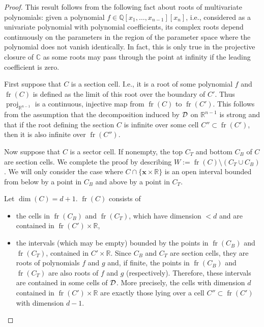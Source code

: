 \documentclass[
]{book}
\providecommand{\tightlist}{%
  \setlength{\itemsep}{0pt}\setlength{\parskip}{0pt}}
\theoremstyle{definition}
\theoremstyle{definition}
\theoremstyle{definition}
\theoremstyle{definition}
\theoremstyle{remark}
\begin{document}
\begin{proof}
This result follows from the following fact about roots of multivariate polynomials: given a polynomial \(f \in \mathbb{Q}[x_1,\ldots,x_{n-1}][x_n]\), i.e., considered as a univariate polynomial with polynomial coefficients, its complex roots depend continuously on the parameters in the region of the parameter space where the polynomial does not vanish identically. In fact, this is only true in the projective closure of \(\mathbb{C}\) as some roots may pass through the point at infinity if the leading coefficient is zero.

First suppose that \(C\) is a section cell. I.e., it is a root of some polynomial \(f\) and \({\operatorname{fr} \left( C \right)}\) is defined as the limit of this root over the boundary of \(C'\). Thus \({\operatorname{proj}_{\mathbb{R}^{n-1}}}\) is a continuous, injective map from \({\operatorname{fr} \left( C \right)}\) to \({\operatorname{fr} \left( C' \right)}\). This follows from the assumption that the decomposition induced by \(\cal D\) on \(\mathbb{R}^{n-1}\) is strong and that if the root defining the section \(C\) is infinite over some cell \(C'' \subset {\operatorname{fr} \left( C' \right)}\), then it is also infinite over \({\operatorname{fr} \left( C'' \right)}\).

Now suppose that \(C\) is a sector cell. If nonempty, the top \(C_T\) and bottom \(C_B\) of \(C\) are section cells. We complete the proof by describing \(W := {\operatorname{fr} \left( C \right)} \setminus (C_T \cup C_B)\).
We will only consider the case where \(C \cap \{ \mathbf{x} \times \mathbb{R}\}\) is an open interval bounded from below by a point in \(C_B\) and above by a point in \(C_T\).

Let \(\dim(C) = d + 1\). \({\operatorname{fr} \left( C \right)}\) consists of

\begin{itemize}
\tightlist
\item
  the cells in \({\operatorname{fr} \left( C_B \right)}\) and \({\operatorname{fr} \left( C_T \right)}\), which have dimension \(< d\) and are contained in \({\operatorname{fr} \left( C' \right)} \times \mathbb{R}\),
\item
  the intervals (which may be empty) bounded by the points in \({\operatorname{fr} \left( C_B \right)}\) and \({\operatorname{fr} \left( C_T \right)}\), contained in \(C' \times \mathbb{R}\). Since \(C_B\) and \(C_T\) are section cells, they are roots of polynomials \(f\) and \(g\) and, if finite, the points in \({\operatorname{fr} \left( C_B \right)}\) and \({\operatorname{fr} \left( C_T \right)}\) are also roots of \(f\) and \(g\) (respectively). Therefore, these intervals are contained in some cells of \(\cal D\). More precisely, the cells with dimension \(d\) contained in \({\operatorname{fr} \left( C' \right)} \times \mathbb{R}\) are exactly those lying over a cell \(C'' \subset {\operatorname{fr} \left( C' \right)}\) with dimension \(d-1\).
\end{itemize}


\end{proof}
\end{document}
